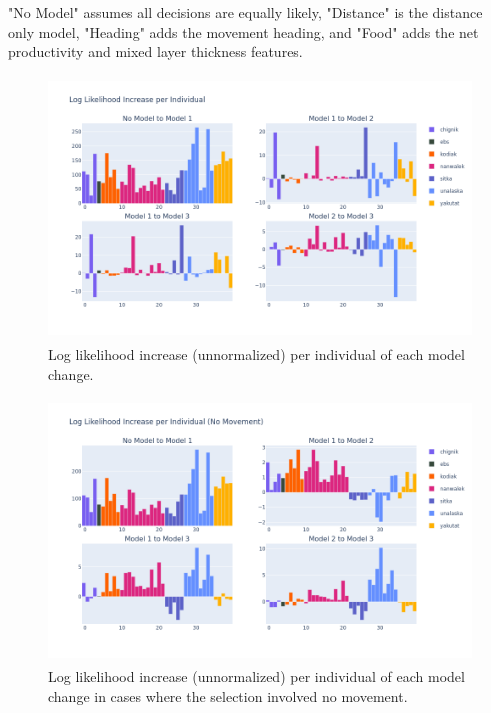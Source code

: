\documentclass[11pt]{article}
\begin{document}
"No Model" assumes all decisions are equally likely, "Distance" is the distance only model, "Heading" adds the movement heading, and "Food" adds the net productivity and mixed layer thickness features. \newline

\begin{figure}[h!] 
	\centering
  \includegraphics[height=70mm]{figures/ll_increase.png}
  \caption{Log likelihood increase (unnormalized) per individual of each model change.}
  \label{fig:ll_increase}
\end{figure}

\begin{figure}[h!] 
	\centering
  \includegraphics[height=70mm]{figures/ll_increase_no_movement.png}
  \caption{Log likelihood increase (unnormalized) per individual of each model change in cases where the selection involved no movement.}
  \label{fig:ll_increase_no_movement}
\end{figure}

\FloatBarrier
\end{document}
